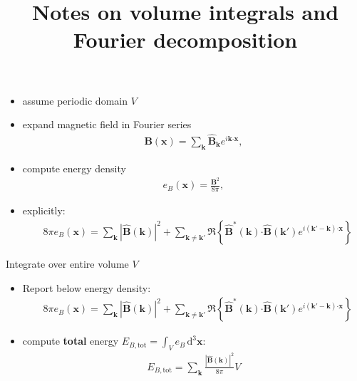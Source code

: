 \documentclass[aspectratio=169,usepdftitle=true,t]{beamer}
\title{Notes on volume integrals and Fourier decomposition}
\subtitle{}
\newcommand{\ud}{\,\mathrm{d}}
\newcommand{\bcdot}{\bm{\cdot}}
\begin{document}
	
\maketitle


\begin{frame}
	\begin{itemize}
		\item assume periodic domain $V$
		\item expand magnetic field in Fourier series
		\begin{align*}
			\bm B (\bm x) = \sum_{\bm k}  \hat{ \bm B}_{\bm k} e^{i \bm k \bcdot \bm x }, \label{eq:synthetic_magnetic_field}
		\end{align*}
		\item compute energy density 
		\begin{align*}
			e_B (\bm x) = \frac{\bm B^2}{8\pi},
		\end{align*}
		\item explicitly:
		\begin{align*}
			&8 \pi e_B (\bm x) = \sum_{\bm k}  |\hat{ \bm B}({\bm k})|^2 + \sum_{\bm k \neq \bm k'} \Re \left\lbrace \hat{ \bm B}^* ({\bm k}) \bcdot \hat{ \bm B} ({\bm k'}) e^{i (\bm k' - \bm k) \bcdot\bm x } \right\rbrace 
		\end{align*}
	\end{itemize}
	
\end{frame}

\begin{frame}{Integrate over entire volume $V$}
	\begin{itemize}
		\item Report below energy density:
		\begin{align*}
			&8 \pi e_B (\bm x) = \sum_{\bm k}  |\hat{ \bm B}({\bm k})|^2 + \sum_{\bm k \neq \bm k'} \Re \left\lbrace \hat{ \bm B}^* ({\bm k}) \bcdot \hat{ \bm B} ({\bm k'}) e^{i (\bm k' - \bm k) \bcdot\bm x } \right\rbrace 
		\end{align*}
		\item compute \textbf{total} energy $E_{B,\mathrm{tot}} = \int_V e_B \ud^3 \bm x$:
		\begin{align*}
			E_{B,\mathrm{tot}} = \sum_{\bm k}  \frac{|\hat{ \bm B}({\bm k})|^2}{8 \pi} V
		\end{align*}
		
	\end{itemize}
\end{frame}
\end{document}
